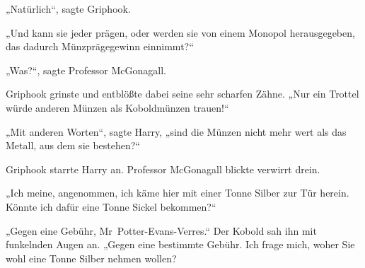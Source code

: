 „Natürlich“, sagte Griphook.

„Und kann sie jeder prägen, oder werden sie von einem Monopol herausgegeben, das dadurch Münzprägegewinn einnimmt?“

„Was?“, sagte Professor McGonagall.

Griphook grinste und entblößte dabei seine sehr scharfen Zähne. „Nur ein Trottel würde anderen Münzen als Koboldmünzen trauen!“

„Mit anderen Worten“, sagte Harry, „sind die Münzen nicht mehr wert als das Metall, aus dem sie bestehen?“

Griphook starrte Harry an. Professor McGonagall blickte verwirrt drein.

„Ich meine, angenommen, ich käme hier mit einer Tonne Silber zur Tür herein. Könnte ich dafür eine Tonne Sickel bekommen?“

„Gegen eine Gebühr, Mr~Potter-Evans-Verres.“ Der Kobold sah ihn mit funkelnden Augen an. „Gegen eine bestimmte Gebühr. Ich frage mich, woher Sie wohl eine Tonne Silber nehmen wollen?

